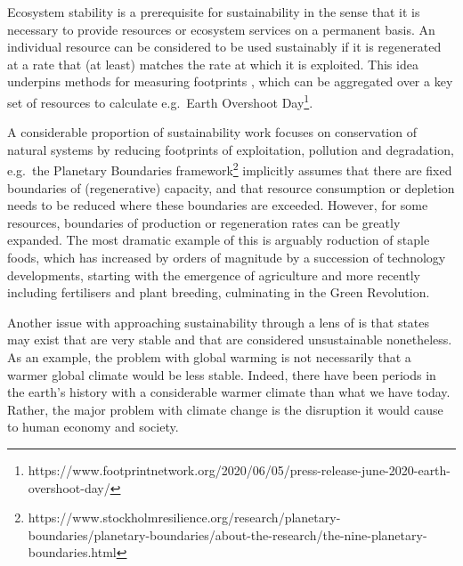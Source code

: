\documentclass[conference]{IEEEtran}
\begin{document}

Ecosystem stability is a prerequisite for sustainability in the sense
that it is necessary to provide resources or ecosystem services on a
permanent basis. An individual resource can be considered to be used
sustainably if it is regenerated at a rate that (at least) matches the
rate at which it is exploited. This idea underpins methods for
measuring footprints \cite{Wackernagel2019_defyingthefootprintoracle},
which can be aggregated over a key set of resources to calculate e.g.\
Earth Overshoot
Day\footnote{https://www.footprintnetwork.org/2020/06/05/press-release-june-2020-earth-overshoot-day/}.

A considerable proportion of sustainability work focuses on
conservation of natural systems by reducing footprints of
exploitation, pollution and degradation, e.g.\ the Planetary
Boundaries
framework\footnote{https://www.stockholmresilience.org/research/planetary-boundaries/planetary-boundaries/about-the-research/the-nine-planetary-boundaries.html}
implicitly assumes that there are fixed boundaries of (regenerative)
capacity, and that resource consumption or depletion needs to be
reduced where these boundaries are exceeded. However, for some
resources, boundaries of production or regeneration rates can be
greatly expanded. The most dramatic example of this is arguably
roduction of staple foods, which has increased by orders of magnitude
by a succession of technology developments, starting with the
emergence of agriculture and more recently including fertilisers and
plant breeding, culminating in the Green Revolution.

Another issue with approaching sustainability through a lens of is
that states may exist that are very stable and that are considered
unsustainable nonetheless. As an example, the problem with global
warming is not necessarily that a warmer global climate would be less
stable. Indeed, there have been periods in the earth's history with a
considerable warmer climate than what we have today. Rather, the major
problem with climate change is the disruption it would cause to human
economy and society.


\end{document}
